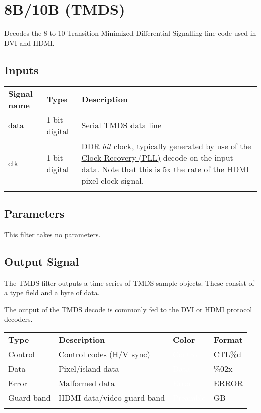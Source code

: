 \pagebreak
\section{8B/10B (TMDS)}

Decodes the 8-to-10 Transition Minimized Differential Signalling line code used in DVI and HDMI.

\subsection{Inputs}

\begin{tabularx}{16cm}{llX}
\thickhline
\textbf{Signal name} & \textbf{Type} & \textbf{Description} \\
\thickhline
data & 1-bit digital & Serial TMDS data line \\
\thickhline
clk & 1-bit digital & DDR \emph{bit} clock, typically generated by use of the \hyperref[filter:cdrpll]{Clock Recovery
(PLL)} decode on the input data. Note that this is 5x the rate of the HDMI pixel clock signal. \\
\thickhline
\end{tabularx}

\subsection{Parameters}

This filter takes no parameters.

\subsection{Output Signal}

The TMDS filter outputs a time series of TMDS sample objects. These consist of a type field and a byte of data.

The output of the TMDS decode is commonly fed to the \hyperref[filter:dvi]{DVI} or \hyperref[filter:hdmi]{HDMI}
protocol decoders.

\begin{tabularx}{16cm}{lllX}
\thickhline
\textbf{Type} & \textbf{Description} & \textbf{Color} & \textbf{Format} \\
\thickhline
Control & Control codes (H/V sync) & \cellcolor{control}\textcolor{white}{Control} & CTL\%d \\
\thickhline
Data & Pixel/island data & \cellcolor{data}\textcolor{white}{Data} & \%02x \\
\thickhline
Error & Malformed data & \cellcolor{error}\textcolor{white}{Error} & ERROR \\
\thickhline
Guard band & HDMI data/video guard band & \cellcolor{preamble}\textcolor{white}{Preamble} & GB \\
\thickhline
\end{tabularx}


